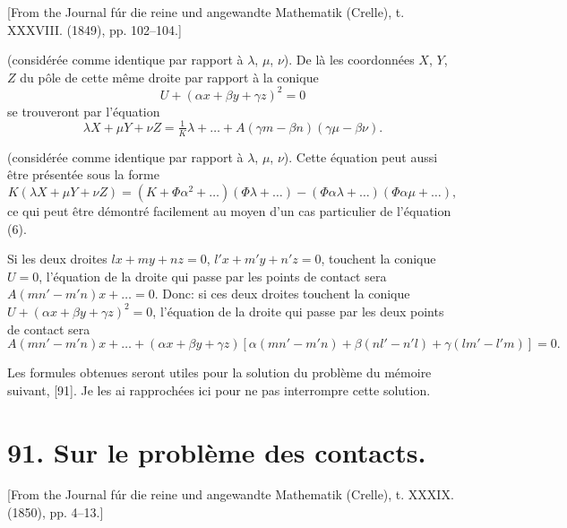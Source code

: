 \documentclass[11pt,a4paper]{book}
\begin{document}
[From the Journal f\'{u}r die reine und angewandte Mathematik (Crelle), t. XXXVIII. (1849), pp. 102--104.]

(consid\'{e}r\'{e}e comme identique par rapport \`{a} $\lambda$, $\mu$, $\nu$). De l\`{a} les coordonn\'{e}es $X$, $Y$, $Z$ du p\^{o}le de cette m\^{e}me droite par rapport \`{a} la conique
\[
U + (\alpha x + \beta y + \gamma z)^2 = 0
\]
se trouveront par l'\'{e}quation
\[
\lambda X + \mu Y + \nu Z = \tfrac{1}{K}\lambda + \ldots + A(\gamma m - \beta n)(\gamma \mu - \beta \nu).
\]
\begin{equation}\tag{11}
\end{equation}

(consid\'{e}r\'{e}e comme identique par rapport \`{a} $\lambda$, $\mu$, $\nu$). Cette \'{e}quation peut aussi \^{e}tre pr\'{e}sent\'{e}e sous la forme
\begin{equation}\tag{12}
K(\lambda X + \mu Y + \nu Z) = (K + \Phi \alpha^2 + \ldots)(\Phi \lambda + \ldots) - (\Phi \alpha \lambda + \ldots)(\Phi \alpha \mu + \ldots),
\end{equation}
ce qui peut \^{e}tre d\'{e}montr\'{e} facilement au moyen d'un cas particulier de l'\'{e}quation (6).

Si les deux droites $lx + my + nz = 0$, $l'x + m'y + n'z = 0$, touchent la conique $U = 0$, l'\'{e}quation de la droite qui passe par les points de contact sera $A(mn' - m'n)x + \ldots = 0$. Donc: si ces deux droites touchent la conique $U + (\alpha x + \beta y + \gamma z)^2 = 0$, l'\'{e}quation de la droite qui passe par les deux points de contact sera
\begin{equation}\tag{13}
A(mn' - m'n)x + \ldots + (\alpha x + \beta y + \gamma z)[\alpha(mn' - m'n) + \beta(nl' - n'l) + \gamma(lm' - l'm)] = 0.
\end{equation}

Les formules obtenues seront utiles pour la solution du probl\`{e}me du m\'{e}moire suivant, [91]. Je les ai rapproch\'{e}es ici pour ne pas interrompre cette solution.

\newpage


\section*{91. Sur le probl\`{e}me des contacts.}

[From the Journal f\'{u}r die reine und angewandte Mathematik (Crelle), t. XXXIX. (1850), pp. 4--13.]
\end{document}
